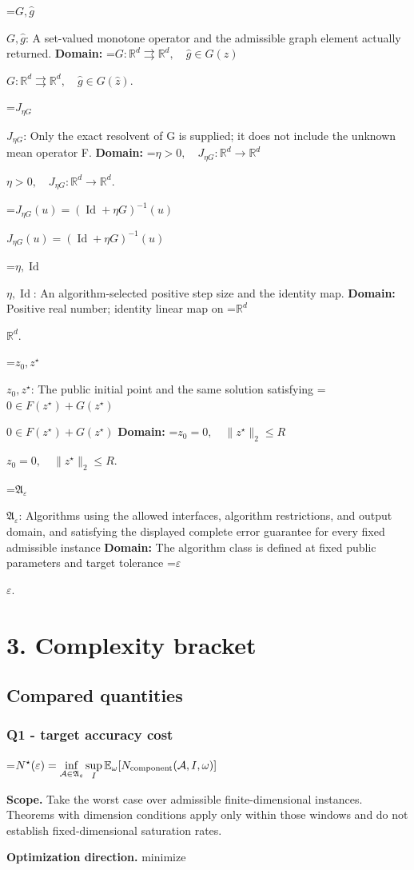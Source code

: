 \documentclass[10pt,a4paper]{article}
\newcommand{\AtlasMath}[1]{\par\begingroup\centering\setbox0=\hbox{$\displaystyle #1$}\ifdim\wd0>1.4\linewidth\typeout{ATLAS WIDE FORMULA: \the\wd0}\fi\ifdim\wd0>\linewidth\resizebox{\linewidth}{!}{\box0}\else\box0\fi\par\endgroup}
\newcommand{\AtlasInlineMath}[1]{\begingroup\setbox0=\hbox{$#1$}\ifdim\wd0>.4\linewidth\endgroup\AtlasMath{#1}\else\endgroup$#1$\fi}
\begin{document}
\AtlasInlineMath{G,\widehat g}: A set-valued monotone operator and the admissible graph element actually returned. \textbf{Domain:} \AtlasInlineMath{G:\mathbb R^d\rightrightarrows\mathbb R^d,\quad\widehat g\in G(\widehat z)}.

\AtlasInlineMath{J_{\eta G}}: Only the exact resolvent of G is supplied; it does not include the unknown mean operator F. \textbf{Domain:} \AtlasInlineMath{\eta>0,\quad J_{\eta G}:\mathbb R^d\to\mathbb R^d}.

\AtlasInlineMath{J_{\eta G}(u)=(\operatorname{Id}+\eta G)^{-1}(u)}

\AtlasInlineMath{\eta,\operatorname{Id}}: An algorithm-selected positive step size and the identity map. \textbf{Domain:} Positive real number; identity linear map on \AtlasInlineMath{\mathbb R^d}.

\AtlasInlineMath{z_0,z^\star}: The public initial point and the same solution satisfying \AtlasInlineMath{0\in F(z^\star)+G(z^\star)} \textbf{Domain:} \AtlasInlineMath{z_0=0,\quad\|z^\star\|_2\le R}.

\AtlasInlineMath{\mathfrak A_\varepsilon}: Algorithms using the allowed interfaces, algorithm restrictions, and output domain, and satisfying the displayed complete error guarantee for every fixed admissible instance \textbf{Domain:} The algorithm class is defined at fixed public parameters and target tolerance \AtlasInlineMath{\varepsilon}.

\section{3. Complexity bracket}
\subsection{Compared quantities}
\subsubsection{Q1 - target accuracy cost}
\AtlasMath{N^\star(\varepsilon)=\inf_{\mathcal A\in\mathfrak A_\varepsilon}\sup_I \mathbb E_\omega[N_{\rm component}(\mathcal A,I,\omega)]}
\textbf{Scope.} Take the worst case over admissible finite-dimensional instances. Theorems with dimension conditions apply only within those windows and do not establish fixed-dimensional saturation rates.

\textbf{Optimization direction.} minimize
\end{document}
